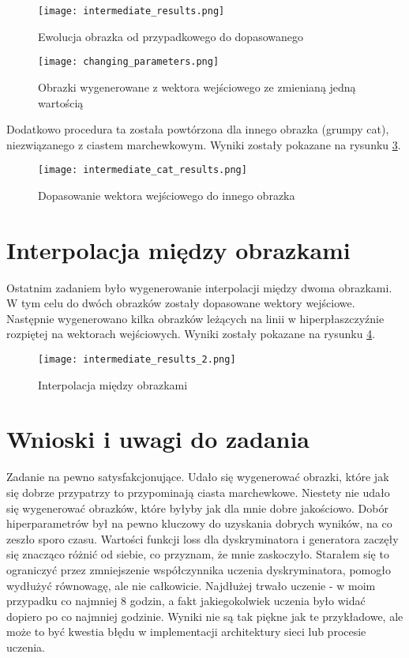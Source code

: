 \documentclass[a4paper]{article}
\begin{document}
\begin{figure}[H]
    \centering
    \texttt{[image: intermediate\_results.png]}
    \caption{Ewolucja obrazka od przypadkowego do dopasowanego}
    \label{fig:fitting_evolution}
\end{figure}

\begin{figure}[H]
    \centering
    \texttt{[image: changing\_parameters.png]}
    \caption{Obrazki wygenerowane z wektora wejściowego ze zmienianą jedną wartością}
    \label{fig:fitting_varying}
\end{figure}

Dodatkowo procedura ta została powtórzona dla innego obrazka (grumpy cat),
niezwiązanego z ciastem marchewkowym. Wyniki zostały pokazane
na rysunku \ref{fig:fitting_other}.

\begin{figure}[H]
    \centering
    \texttt{[image: intermediate\_cat\_results.png]}
    \caption{Dopasowanie wektora wejściowego do innego obrazka}
    \label{fig:fitting_other}
\end{figure}

\section{Interpolacja między obrazkami}

Ostatnim zadaniem było wygenerowanie interpolacji między dwoma obrazkami.
W tym celu do dwóch obrazków zostały dopasowane wektory wejściowe. Następnie
wygenerowano kilka obrazków leżących na linii w hiperpłaszczyźnie rozpiętej
na wektorach wejściowych. Wyniki zostały pokazane na rysunku \ref{fig:interpolation}.

\begin{figure}[H]
    \centering
    \texttt{[image: intermediate\_results\_2.png]}
    \caption{Interpolacja między obrazkami}
    \label{fig:interpolation}
\end{figure}

\section{Wnioski i uwagi do zadania}

Zadanie na pewno satysfakcjonujące. Udało się wygenerować obrazki, które
jak się dobrze przypatrzy to przypominają ciasta marchewkowe. Niestety
nie udało się wygenerować obrazków, które byłyby jak dla mnie dobre jakościowo.
Dobór hiperparametrów był na pewno kluczowy do uzyskania dobrych wyników,
na co zeszło sporo czasu. Wartości funkcji loss dla dyskryminatora i generatora
zaczęły się znacząco różnić od siebie, co przyznam, że mnie zaskoczyło. Starałem
się to ograniczyć przez zmniejszenie współczynnika uczenia dyskryminatora,
pomogło wydłużyć równowagę, ale nie całkowicie. Najdłużej trwało uczenie -
w moim przypadku co najmniej 8 godzin, a fakt jakiegokolwiek uczenia było widać
dopiero po co najmniej godzinie. Wyniki nie są tak piękne jak te przykładowe,
ale może to być kwestia błędu w implementacji architektury sieci lub procesie uczenia.
\end{document}
